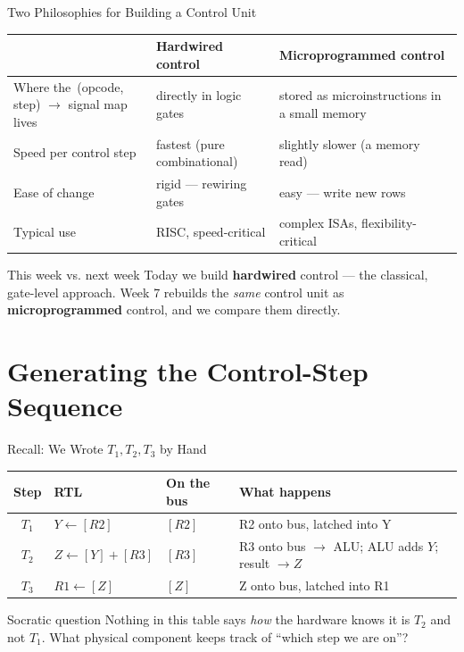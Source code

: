 \documentclass[aspectratio=169]{beamer}
\begin{document}
\begin{frame}{Two Philosophies for Building a Control Unit}
  \begin{center}
    \small
    \begin{tabular}{@{}p{3.4cm}p{4.9cm}p{4.9cm}@{}}
      \toprule
      & \textbf{Hardwired control} & \textbf{Microprogrammed control} \\
      \midrule
      Where the \,(opcode, step) $\to$ signal map lives &
      directly in logic gates &
      stored as microinstructions in a small memory \\
      Speed per control step & fastest (pure combinational) & slightly slower (a memory read) \\
      Ease of change & rigid --- rewiring gates & easy --- write new rows \\
      Typical use & RISC, speed-critical & complex ISAs, flexibility-critical \\
      \bottomrule
    \end{tabular}
  \end{center}
  \begin{exampleblock}{This week vs. next week}
    Today we build \textbf{hardwired} control --- the classical, gate-level
    approach. Week 7 rebuilds the \emph{same} control unit as
    \textbf{microprogrammed} control, and we compare them directly.
  \end{exampleblock}
\end{frame}


\section{Generating the Control-Step Sequence}

\begin{frame}{Recall: We Wrote $T_1, T_2, T_3$ by Hand}
  \footnotesize
  \begin{tabular}{@{}clll@{}}
    \toprule
    \textbf{Step} & \textbf{RTL} & \textbf{On the bus} & \textbf{What happens} \\
    \midrule
    $T_1$ & $Y \gets [R2]$            & $[R2]$      & R2 onto bus, latched into Y \\
    $T_2$ & $Z \gets [Y] + [R3]$      & $[R3]$      & R3 onto bus $\to$ ALU; ALU adds $Y$; result $\to Z$ \\
    $T_3$ & $R1 \gets [Z]$            & $[Z]$       & Z onto bus, latched into R1 \\
    \bottomrule
  \end{tabular}
  \vspace{0.3cm}
  \begin{block}{Socratic question}
    Nothing in this table says \emph{how} the hardware knows it is $T_2$ and not
    $T_1$. What physical component keeps track of ``which step we are on''?
  \end{block}
\end{frame}
\end{document}

